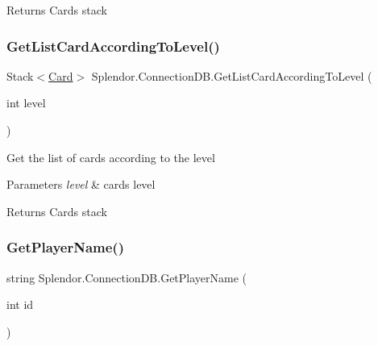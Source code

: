 \begin{DoxyReturn}{Returns}
Cards stack
\end{DoxyReturn}
\mbox{\label{class_splendor_1_1_connection_d_b_abcd995d0fa97aa5f3a40ff5c23b22502}} 
\subsubsection{\texorpdfstring{Get\+List\+Card\+According\+To\+Level()}{GetListCardAccordingToLevel()}}
{\footnotesize\ttfamily Stack$<$\hyperlink{class_splendor_1_1_card}{Card}$>$ Splendor.\+Connection\+D\+B.\+Get\+List\+Card\+According\+To\+Level (\begin{DoxyParamCaption}\item[{int}]{level }\end{DoxyParamCaption})}



Get the list of cards according to the level 


\begin{DoxyParams}{Parameters}
{\em level} & card\textquotesingle{}s level\\
\hline
\end{DoxyParams}
\begin{DoxyReturn}{Returns}
Cards stack
\end{DoxyReturn}
\mbox{\label{class_splendor_1_1_connection_d_b_a7d715d5452049ad06f4a407fa5df151c}} 
\subsubsection{\texorpdfstring{Get\+Player\+Name()}{GetPlayerName()}}
{\footnotesize\ttfamily string Splendor.\+Connection\+D\+B.\+Get\+Player\+Name (\begin{DoxyParamCaption}\item[{int}]{id }\end{DoxyParamCaption})}



